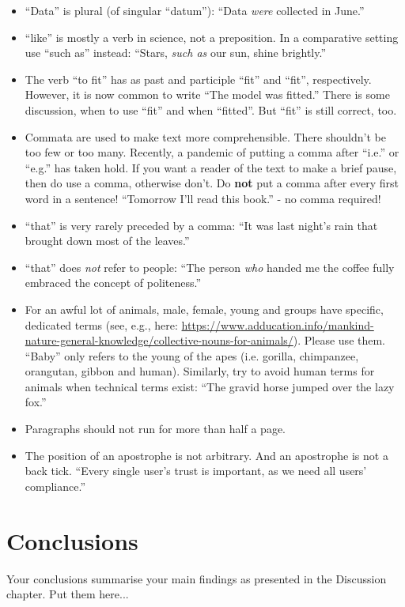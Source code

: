 \begin{itemize}
\item ``Data'' is plural (of singular ``datum''): ``Data \emph{were} collected in June.''
\item ``like'' is mostly a verb in science, not a preposition. In a comparative setting use ``such as'' instead: ``Stars, \emph{such as} our sun, shine brightly.''
\item The verb ``to fit'' has as past and participle ``fit'' and ``fit'', respectively. However, it is now common to write ``The model was fitted.'' There is some discussion, when to use ``fit'' and when ``fitted''. But ``fit'' is still correct, too.
\item Commata are used to make text more comprehensible. There shouldn't be too few or too many. Recently, a pandemic of putting a comma after ``i.e.'' or ``e.g.'' has taken hold. If you want a reader of the text to make a brief pause, then do use a comma, otherwise don't. Do \textbf{not} put a comma after every first word in a sentence! ``Tomorrow I'll read this book.'' - no comma required!
\item ``that'' is very rarely preceded by a comma: ``It was last night's rain that brought down most of the leaves.''
\item ``that'' does \emph{not} refer to people: ``The person \emph{who} handed me the coffee fully embraced the concept of politeness.''
\item For an awful lot of animals, male, female, young and groups have specific, dedicated terms (see, e.g., here: \url{https://www.adducation.info/mankind-nature-general-knowledge/collective-nouns-for-animals/}). Please use them. ``Baby'' only refers to the young of the apes (i.e. gorilla, chimpanzee, orangutan, gibbon and human). Similarly, try to avoid human terms for animals when technical terms exist: ``The gravid horse jumped over the lazy fox.''
\item Paragraphs should not run for more than half a page.
\item The position of an apostrophe is not arbitrary. And an apostrophe is not a back tick. ``Every single user's trust is important, as we need all users' compliance.'' 
\end{itemize}


\section{Conclusions}
\label{sec:conclusions}

  Your conclusions summarise your main findings as presented in the
  Discussion chapter. Put them here...

